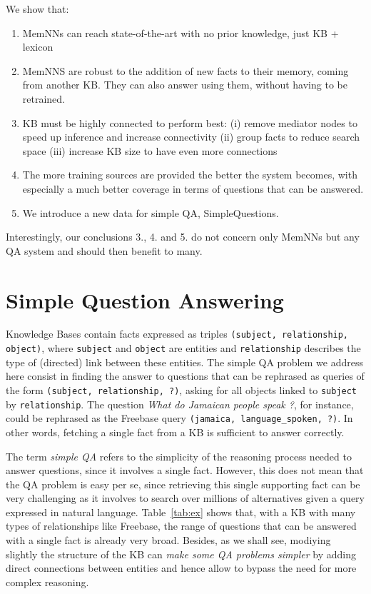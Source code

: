 \documentclass[11pt,a4paper]{article}
\newcommand{\fb}{{\sf Freebase}\xspace}
\newcommand{\fbq}{{\sf SimpleQuestions}\xspace}
\newcommand{\tofact}[1]{{\tt {\small #1}}}
\begin{document}
We show that:
\begin{enumerate}
\item
  MemNNs can reach state-of-the-art with no prior knowledge,
    just KB + lexicon\item
MemNNS are robust to the addition of new facts to their memory,
coming from another KB. They can also answer using them, without
having to be retrained.
 \item
   KB must be highly connected to perform best:
        (i) remove mediator nodes to speed up inference and increase
        connectivity
        (ii) group facts to reduce search space
        (iii) increase KB size to have even more
        connections
\item
  The more training sources are provided the better the system
  becomes, with especially a much better coverage in terms of
  questions that can be answered.
\item
  We introduce a new data for simple QA, \fbq.
\end{enumerate}
 Interestingly, our conclusions 3., 4. and 5. do not concern only MemNNs
 but any QA system and should then benefit to many.
\fi





\section{Simple Question Answering}
\label{sec:fbq}

Knowledge Bases contain facts expressed as triples \tofact{(subject,
  relationship, object)}, where \tofact{subject} and \tofact{object}
are entities and \tofact{relationship} describes the type of
(directed) link between these entities. 
The simple QA problem we address here consist in finding the
answer to questions that can be rephrased as queries of the form
\tofact{(subject, relationship, ?)}, asking for all objects linked to
\tofact{subject} by \tofact{relationship}. The question {\it What do
  Jamaican people speak ?}, for instance, could be rephrased as the
\fb query \tofact{(jamaica, language\_spoken, ?)}.
In other words, fetching a single fact from a KB is sufficient to
answer correctly.

The term {\it simple QA} refers to the simplicity of the reasoning
process needed to answer questions, since it involves a single fact.
However, this does not mean that the QA problem is easy per se, since
retrieving this single supporting fact can be very challenging as
it involves to search over millions of alternatives given a query
expressed in natural language.
Table~\ref{tab:ex} shows that, with a KB with many
types of relationships like \fb, the range of questions that can be
answered with a single fact is already very broad.
Besides, as we shall see, modiying slightly the structure
of the KB can {\it make some QA problems simpler} by adding direct
connections between entities and hence allow to bypass the need for
more complex reasoning.
\end{document}
